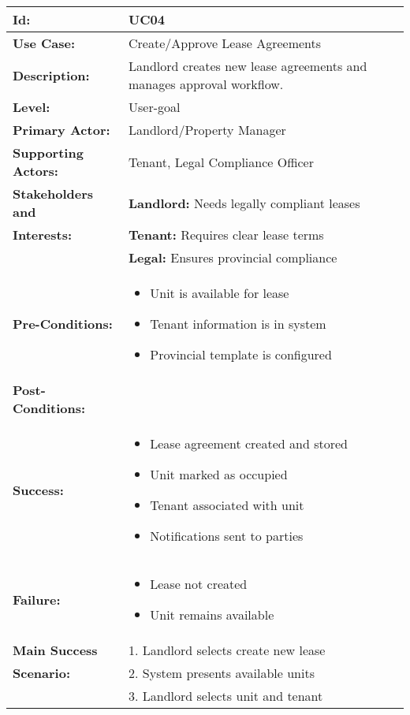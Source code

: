 \documentclass[12pt]{article}
\begin{document}
\begin{longtable}{|p{3cm}|p{11cm}|}
\hline
\textbf{Id:} & UC04 \\
\hline
\textbf{Use Case:} & Create/Approve Lease Agreements \\
\hline
\textbf{Description:} & Landlord creates new lease agreements and manages approval workflow. \\
\hline
\textbf{Level:} & User-goal \\
\hline
\textbf{Primary Actor:} & Landlord/Property Manager \\
\hline
\textbf{Supporting Actors:} & Tenant, Legal Compliance Officer \\
\hline
\textbf{Stakeholders and} & \textbf{Landlord:} Needs legally compliant leases \\
\textbf{Interests:} & \textbf{Tenant:} Requires clear lease terms \\
& \textbf{Legal:} Ensures provincial compliance \\
\hline
\textbf{Pre-Conditions:} & 
\begin{itemize}
    \item Unit is available for lease
    \item Tenant information is in system
    \item Provincial template is configured
\end{itemize} \\
\hline
\textbf{Post-Conditions:} & \\
\textbf{Success:} & 
\begin{itemize}
    \item Lease agreement created and stored
    \item Unit marked as occupied
    \item Tenant associated with unit
    \item Notifications sent to parties
\end{itemize} \\
\textbf{Failure:} & 
\begin{itemize}
    \item Lease not created
    \item Unit remains available
\end{itemize} \\
\hline
\textbf{Main Success} & 1. Landlord selects create new lease \\
\textbf{Scenario:} & 2. System presents available units \\
& 3. Landlord selects unit and tenant \\

\end{longtable}
\end{document}
